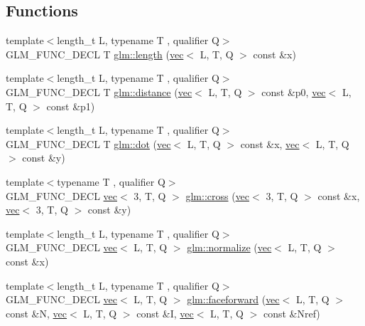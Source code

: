 \subsection*{Functions}
\begin{DoxyCompactItemize}
\item 
{\footnotesize template$<$length\+\_\+t L, typename T , qualifier Q$>$ }\\G\+L\+M\+\_\+\+F\+U\+N\+C\+\_\+\+D\+E\+CL T \hyperlink{group__core__func__geometric_ga0cdabbb000834d994a1d6dc56f8f5263}{glm\+::length} (\hyperlink{structglm_1_1vec}{vec}$<$ L, T, Q $>$ const \&x)
\item 
{\footnotesize template$<$length\+\_\+t L, typename T , qualifier Q$>$ }\\G\+L\+M\+\_\+\+F\+U\+N\+C\+\_\+\+D\+E\+CL T \hyperlink{group__core__func__geometric_gaa68de6c53e20dfb2dac2d20197562e3f}{glm\+::distance} (\hyperlink{structglm_1_1vec}{vec}$<$ L, T, Q $>$ const \&p0, \hyperlink{structglm_1_1vec}{vec}$<$ L, T, Q $>$ const \&p1)
\item 
{\footnotesize template$<$length\+\_\+t L, typename T , qualifier Q$>$ }\\G\+L\+M\+\_\+\+F\+U\+N\+C\+\_\+\+D\+E\+CL T \hyperlink{group__core__func__geometric_gaad6c5d9d39bdc0bf43baf1b22e147a0a}{glm\+::dot} (\hyperlink{structglm_1_1vec}{vec}$<$ L, T, Q $>$ const \&x, \hyperlink{structglm_1_1vec}{vec}$<$ L, T, Q $>$ const \&y)
\item 
{\footnotesize template$<$typename T , qualifier Q$>$ }\\G\+L\+M\+\_\+\+F\+U\+N\+C\+\_\+\+D\+E\+CL \hyperlink{structglm_1_1vec}{vec}$<$ 3, T, Q $>$ \hyperlink{group__core__func__geometric_gaeeec0794212fe84fc9d261de067c9587}{glm\+::cross} (\hyperlink{structglm_1_1vec}{vec}$<$ 3, T, Q $>$ const \&x, \hyperlink{structglm_1_1vec}{vec}$<$ 3, T, Q $>$ const \&y)
\item 
{\footnotesize template$<$length\+\_\+t L, typename T , qualifier Q$>$ }\\G\+L\+M\+\_\+\+F\+U\+N\+C\+\_\+\+D\+E\+CL \hyperlink{structglm_1_1vec}{vec}$<$ L, T, Q $>$ \hyperlink{group__core__func__geometric_ga3b8d3dcae77870781392ed2902cce597}{glm\+::normalize} (\hyperlink{structglm_1_1vec}{vec}$<$ L, T, Q $>$ const \&x)
\item 
{\footnotesize template$<$length\+\_\+t L, typename T , qualifier Q$>$ }\\G\+L\+M\+\_\+\+F\+U\+N\+C\+\_\+\+D\+E\+CL \hyperlink{structglm_1_1vec}{vec}$<$ L, T, Q $>$ \hyperlink{group__core__func__geometric_ga7aed0a36c738169402404a3a5d54e43b}{glm\+::faceforward} (\hyperlink{structglm_1_1vec}{vec}$<$ L, T, Q $>$ const \&N, \hyperlink{structglm_1_1vec}{vec}$<$ L, T, Q $>$ const \&I, \hyperlink{structglm_1_1vec}{vec}$<$ L, T, Q $>$ const \&Nref)

\end{DoxyCompactItemize}
